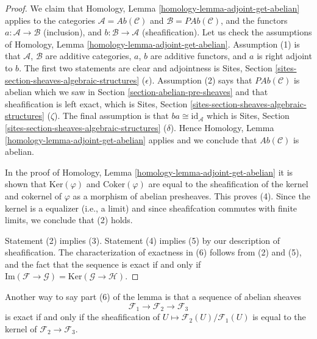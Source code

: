 \begin{proof}
We claim that Homology, Lemma \ref{homology-lemma-adjoint-get-abelian}
applies to the categories $\mathcal{A} = \textit{Ab}(\mathcal{C})$
and $\mathcal{B} = \textit{PAb}(\mathcal{C})$, and the functors
$a : \mathcal{A} \to \mathcal{B}$ (inclusion),  and
$b : \mathcal{B} \to \mathcal{A}$ (sheafification).
Let us check the assumptions of
Homology, Lemma \ref{homology-lemma-adjoint-get-abelian}.
Assumption (1) is that $\mathcal{A}$, $\mathcal{B}$ are additive categories,
$a$, $b$ are additive functors, and $a$ is right adjoint to $b$.
The first two statements are clear and adjointness is
Sites, Section \ref{sites-section-sheaves-algebraic-structures} ($\epsilon$).
Assumption (2) says that $\textit{PAb}(\mathcal{C})$ is abelian
which we saw in Section \ref{section-abelian-pre-sheaves} and
that sheafification is left exact, which is
Sites, Section \ref{sites-section-sheaves-algebraic-structures} ($\zeta$).
The final assumption is that $ba \cong \text{id}_{\mathcal{A}}$ which is
Sites, Section \ref{sites-section-sheaves-algebraic-structures} ($\delta$).
Hence Homology, Lemma \ref{homology-lemma-adjoint-get-abelian}
applies and we conclude that $\textit{Ab}(\mathcal{C})$ is abelian.

\medskip\noindent
In the proof of Homology, Lemma \ref{homology-lemma-adjoint-get-abelian}
it is shown that $\text{Ker}(\varphi)$ and $\text{Coker}(\varphi)$
are equal to the sheafification of the kernel and cokernel of $\varphi$
as a morphism of abelian presheaves. This proves (4). Since the kernel
is a equalizer (i.e., a limit) and since sheafifcation commutes with
finite limits, we conclude that (2) holds.

\medskip\noindent
Statement (2) implies (3). Statement (4) implies (5) by our description
of sheafification. The characterization of exactness in (6) follows from
(2) and (5), and the fact that the sequence is exact if and only if
$\text{Im}(\mathcal{F} \to \mathcal{G}) =
\text{Ker}(\mathcal{G} \to \mathcal{H})$.
\end{proof}

\noindent
Another way to say part (6) of the lemma is that a
sequence of abelian sheaves
$$
\mathcal{F}_1 \longrightarrow
\mathcal{F}_2 \longrightarrow
\mathcal{F}_3
$$
is exact if and only if the sheafification of
$U \mapsto \mathcal{F}_2(U)/\mathcal{F}_1(U)$ is equal to the
kernel of $\mathcal{F}_2 \to \mathcal{F}_3$.

